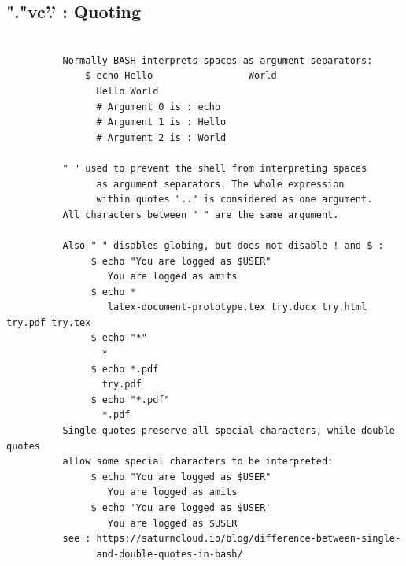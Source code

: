 \documentclass[a4paper,12pt]{article}
\begin{document}
\subsection{"."vc'.'    : Quoting}
\begin{verbatim}

          Normally BASH interprets spaces as argument separators:
              $ echo Hello                 World
                Hello World
                # Argument 0 is : echo
                # Argument 1 is : Hello
                # Argument 2 is : World

          " " used to prevent the shell from interpreting spaces 
                as argument separators. The whole expression
                within quotes ".." is considered as one argument.
          All characters between " " are the same argument.
          
          Also " " disables globing, but does not disable ! and $ :  
               $ echo "You are logged as $USER"
                  You are logged as amits
               $ echo *
                  latex-document-prototype.tex try.docx try.html try.pdf try.tex
               $ echo "*"
                 *
               $ echo *.pdf  
                 try.pdf
               $ echo "*.pdf"  
                 *.pdf
          Single quotes preserve all special characters, while double quotes
          allow some special characters to be interpreted:
               $ echo "You are logged as $USER"
                  You are logged as amits
               $ echo 'You are logged as $USER'   
                  You are logged as $USER
          see : https://saturncloud.io/blog/difference-between-single-
                and-double-quotes-in-bash/         
                 
\end{verbatim}
\end{document}
